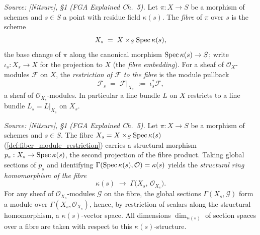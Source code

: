 \begin{definition}\leanok
  \label{def:fiber_module_restriction}
  \textit{Source: [Nitsure], \S 1 (FGA Explained Ch.~5).}
  Let \(\pi : X \to S\) be a morphism of schemes and \(s \in S\) a point with
  residue field \(\kappa(s)\). The \emph{fibre} of \(\pi\) over \(s\) is the
  scheme
  \[
    X_s \;=\; X \times_S \operatorname{Spec} \kappa(s),
  \]
  the base change of \(\pi\) along the canonical morphism
  \(\operatorname{Spec} \kappa(s) \to S\); write \(\iota_s : X_s \to X\) for the projection
  to \(X\) (the \emph{fibre embedding}). For a sheaf of
  \(\mathcal{O}_X\)-modules \(\mathcal{F}\) on \(X\), the \emph{restriction of
  \(\mathcal{F}\) to the fibre} is the module pullback
  \[
    \mathcal{F}_s \;=\; \mathcal{F}|_{X_s} \;:=\; \iota_s^{*} \mathcal{F},
  \]
  a sheaf of \(\mathcal{O}_{X_s}\)-modules. In particular a line bundle \(L\)
  on \(X\) restricts to a line bundle \(L_s = L|_{X_s}\) on \(X_s\).
\end{definition}

\begin{definition}\leanok
  \label{def:fiber_sections_module}
  \textit{Source: [Nitsure], \S 1 (FGA Explained Ch.~5).}
  Let \(\pi : X \to S\) be a morphism of schemes and \(s \in S\). The fibre
  \(X_s = X \times_S \operatorname{Spec} \kappa(s)\) (\cref{def:fiber_module_restriction})
  carries a structural morphism \(p_s : X_s \to \operatorname{Spec} \kappa(s)\), the second
  projection of the fibre product. Taking global sections of \(p_s\) and
  identifying \(\Gamma(\operatorname{Spec} \kappa(s), \mathcal{O}) = \kappa(s)\) yields the
  \emph{structural ring homomorphism of the fibre}
  \[
    \kappa(s) \;\longrightarrow\; \Gamma\bigl(X_s,\, \mathcal{O}_{X_s}\bigr).
  \]
  For any sheaf of \(\mathcal{O}_{X_s}\)-modules \(\mathcal{G}\) on the fibre,
  the global sections \(\Gamma(X_s, \mathcal{G})\) form a module over
  \(\Gamma(X_s, \mathcal{O}_{X_s})\), hence, by restriction of scalars along
  the structural homomorphism, a \(\kappa(s)\)-vector space. All dimensions
  \(\dim_{\kappa(s)}\) of section spaces over a fibre are taken with respect
  to this \(\kappa(s)\)-structure.
\end{definition}

